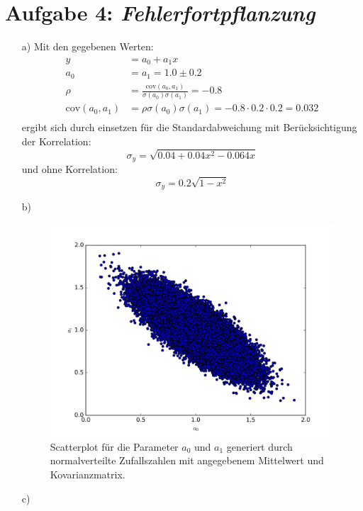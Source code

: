 \section*{Aufgabe 4: \emph{Fehlerfortpflanzung}}
\begin{itemize}

\item[a)]
Mit den gegebenen Werten:
\begin{align*}
y &=a_0+a_1x \\
a_0&=a_1=1.0\pm0.2 \\
\rho& = \frac{\text{cov}(a_0,a_1)}{\sigma(a_0)\sigma(a_1)}=-0.8\\
\text{cov}(a_0,a_1)&=\rho \sigma(a_0)\sigma(a_1)=-0.8\cdot 0.2\cdot 0.2 = 0.032\\
\end{align*}
ergibt sich durch einsetzen für die Standardabweichung mit Berücksichtigung der Korrelation:
\begin{equation*}
\sigma_y = \sqrt{ 0.04 + 0.04x^2 - 0.064x }
\end{equation*}
und ohne Korrelation:
\begin{equation*}
\sigma_y = 0.2 \sqrt{1-x^2}
\end{equation*}
\item[b)] 
\begin{figure}
\centering
\includegraphics[width=\textwidth]{scatterplot_a0_a1.png}
\caption{Scatterplot für die Parameter $a_0$ und $a_1$ generiert durch normalverteilte Zufallszahlen mit angegebenem Mittelwert und Kovarianzmatrix.}
\label{fig:a0a1}
\end{figure}
\item[c)]

\end{itemize}
